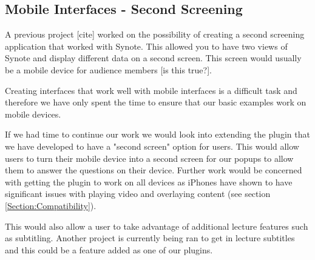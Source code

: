 \subsection{Mobile Interfaces - Second Screening}

A previous project [cite] worked on the possibility of creating a second screening application that worked with Synote. This allowed you to have two views of Synote and display different data on a second screen. This screen would usually be a mobile device for audience members [is this true?].

Creating interfaces that work well with mobile interfaces is a difficult task and therefore we have only spent the time to ensure that our basic examples work on mobile devices.

If we had time to continue our work we would look into extending the plugin that we have developed to have a "second screen" option for users. This would allow users to turn their mobile device into a second screen for our popups to allow them to answer the questions on their device. Further work would be concerned with getting the plugin to work on all devices as iPhones have shown to have significant issues with playing video and overlaying content (see section \ref{Section:Compatibility}).

This would also allow a user to take advantage of additional lecture features such as subtitling. Another project is currently being ran to get in lecture subtitles and this could be a feature added as one of our plugins.